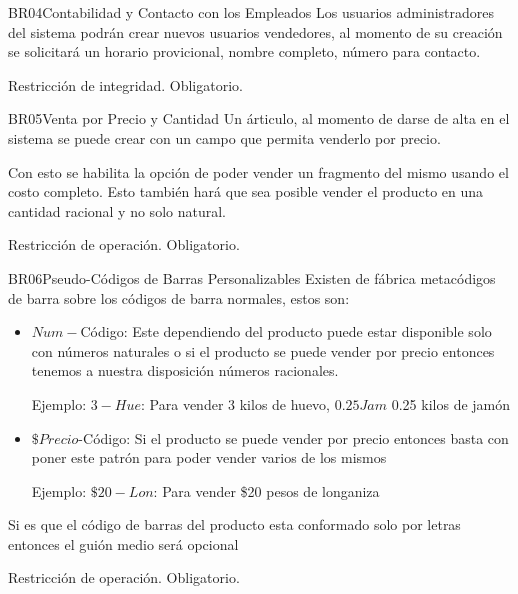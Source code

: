 	\begin{BussinesRule}{BR04}{Contabilidad y Contacto con los Empleados}
		\BRitem[Descripción:] Los usuarios administradores del sistema podrán crear nuevos usuarios vendedores,
		al momento de su creación se solicitará un horario provicional, nombre completo, número para contacto.

		\BRitem[Tipo:] Restricción de integridad.
		\BRitem[Nivel:] Obligatorio.
	\end{BussinesRule}

	\begin{BussinesRule}{BR05}{Venta por Precio y Cantidad}
		\BRitem[Descripción:] Un árticulo, al momento de darse de alta en el sistema se puede crear con un campo que permita
		venderlo por precio.

		Con esto se habilita la opción de poder vender un fragmento del mismo usando el costo completo.
		Esto también hará que sea posible vender el producto en una cantidad racional y no solo natural.

		\BRitem[Tipo:] Restricción de operación.
		\BRitem[Nivel:] Obligatorio.
	\end{BussinesRule}

	\begin{BussinesRule}{BR06}{Pseudo-Códigos de Barras Personalizables}
		\BRitem[Descripción:] 
		Existen de fábrica metacódigos de barra sobre los códigos de barra normales, estos son:
		\begin{itemize}
			\item 
				$Num-$Código: Este dependiendo del producto puede estar disponible solo con números
				naturales o si el producto se puede vender por precio entonces tenemos a nuestra disposición
				números racionales.

				Ejemplo: $3-Hue$: Para vender 3 kilos de huevo, $0.25Jam$ 0.25 kilos de jamón
			\item 
				$\$Precio$-Código: Si el producto se puede vender por precio entonces basta con poner este
				patrón para poder vender varios de los mismos

				Ejemplo: $\$20-Lon$: Para vender \$20 pesos de longaniza
		\end{itemize}

		Si es que el código de barras del producto esta conformado solo por letras entonces el guión medio
		será opcional

		\BRitem[Tipo:] Restricción de operación.
		\BRitem[Nivel:] Obligatorio.
	\end{BussinesRule}

